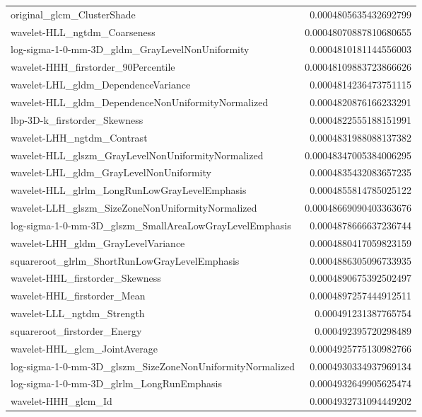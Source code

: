 {\begin{xltabular}[H]{\textwidth}{X r}
        original\_glcm\_ClusterShade & 0.0004805635432692799 \\
        wavelet-HLL\_ngtdm\_Coarseness & 0.00048070887810680655 \\
        log-sigma-1-0-mm-3D\_gldm\_GrayLevelNonUniformity & 0.0004810181144556003 \\
        wavelet-HHH\_firstorder\_90Percentile & 0.00048109883723866626 \\
        wavelet-LHL\_gldm\_DependenceVariance & 0.0004814236473751115 \\
        wavelet-HLL\_gldm\_DependenceNonUniformityNormalized & 0.0004820876166233291 \\
        lbp-3D-k\_firstorder\_Skewness & 0.0004822555188151991 \\
        wavelet-LHH\_ngtdm\_Contrast & 0.0004831988088137382 \\
        wavelet-HLL\_glszm\_GrayLevelNonUniformityNormalized & 0.00048347005384006295 \\
        wavelet-LHL\_gldm\_GrayLevelNonUniformity & 0.0004835432083657235 \\
        wavelet-HLL\_glrlm\_LongRunLowGrayLevelEmphasis & 0.0004855814785025122 \\
        wavelet-LLH\_glszm\_SizeZoneNonUniformityNormalized & 0.00048669090403363676 \\
        log-sigma-1-0-mm-3D\_glszm\_SmallAreaLowGrayLevelEmphasis & 0.0004878666637236744 \\
        wavelet-LHH\_gldm\_GrayLevelVariance & 0.0004880417059823159 \\
        squareroot\_glrlm\_ShortRunLowGrayLevelEmphasis & 0.0004886305096733935 \\
        wavelet-HHL\_firstorder\_Skewness & 0.0004890675392502497 \\
        wavelet-HHL\_firstorder\_Mean & 0.0004897257444912511 \\
        wavelet-LLL\_ngtdm\_Strength & 0.000491231387765754 \\
        squareroot\_firstorder\_Energy & 0.000492395720298489 \\
        wavelet-HHL\_glcm\_JointAverage & 0.0004925775130982766 \\
        log-sigma-1-0-mm-3D\_glszm\_SizeZoneNonUniformityNormalized & 0.0004930334937969134 \\
        log-sigma-1-0-mm-3D\_glrlm\_LongRunEmphasis & 0.0004932649905625474 \\
        wavelet-HHH\_glcm\_Id & 0.0004932731094449202 \\

\end{xltabular}}
